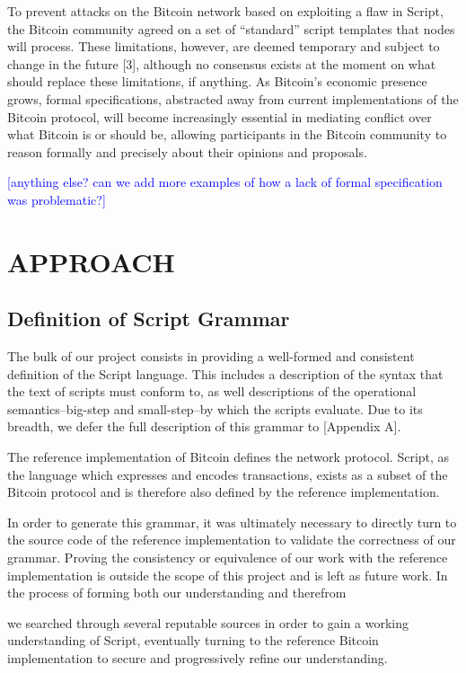 \documentclass[letterpaper, 10 pt, conference]{ieeeconf}
\begin{document}
To prevent attacks on the Bitcoin network based on exploiting a flaw in Script, the Bitcoin community agreed on a set of ``standard'' script templates that nodes will process. These limitations, however, are deemed temporary and subject to change in the future [3], although no consensus exists at the moment on what should replace these limitations, if anything. As Bitcoin's economic presence grows, formal specifications, abstracted away from current implementations of the Bitcoin protocol, will become increasingly essential in mediating conflict over what Bitcoin is or should be, allowing participants in the Bitcoin community to reason formally and precisely about their opinions and proposals.

\textcolor{blue}{[anything else? can we add more examples of how a lack of formal specification was problematic?]}


\section{APPROACH}

\subsection{Definition of Script Grammar}
The bulk of our project consists in providing a well-formed and consistent definition of the Script language. This includes a description of the syntax that the text of scripts must conform to, as well descriptions of the operational semantics--big-step and small-step--by which the scripts evaluate. Due to its breadth, we defer the full description of this grammar to [Appendix A].

The reference implementation of Bitcoin defines the network protocol. Script, as the language which expresses and encodes transactions, exists as a subset of the Bitcoin protocol and is therefore also defined by the reference implementation.

In order to generate this grammar, it was ultimately necessary to directly turn to the source code of the reference implementation to validate the correctness of our grammar. Proving the consistency or equivalence of our work with the reference implementation is outside the scope of this project and is left as future work. In the process of forming both our understanding and therefrom

we searched through several reputable sources in order to gain a working understanding of Script, eventually turning to the reference Bitcoin implementation to secure and progressively refine our understanding.
\end{document}
